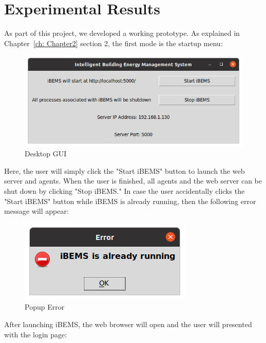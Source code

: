 \chapter{Experimental Results}
\label{ch: Chapter4}

As part of this project, we developed a working prototype. As explained in Chapter~\ref{ch: Chapter2} section 2, the first mode is the startup menu:

\begin{figure}[H]
    \centering
    \includegraphics[scale=0.5]{figs/BEMS_GUI_Linux.png}
    \caption{Desktop GUI}
    \label{fig:desktopgui}
\end{figure}

\noindent
Here, the user will simply click the "Start iBEMS" button to launch the web server and agents. When the user is finished, all agents and the web server can be shut down by clicking "Stop iBEMS." In case the user accidentally clicks the "Start iBEMS" button while iBEMS is already running, then the following error message will appear:

\begin{figure}[H]
    \centering
    \includegraphics[scale=0.5]{figs/BEMS_GUI_Linux_Warning.png}
    \caption{Popup Error}
    \label{fig:popuperror}
\end{figure}

\noindent
After launching iBEMS, the web browser will open and the user will presented with the login page:

